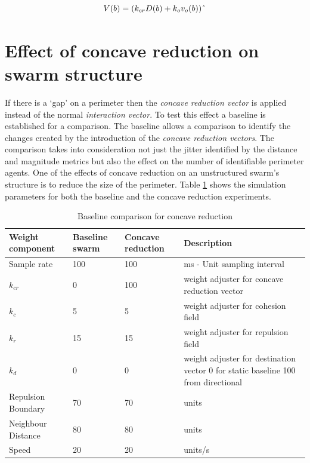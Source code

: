 \documentclass{ieeeaccess}
\begin{document}
\begin{equation}\label{eq:ConcaveVoidPhysics4}
V(b) = (k_{cr}D(b) + k_ov_o(b))\string^
\end{equation}

\section{Effect of concave reduction on swarm structure}
If there is a `gap' on a perimeter then the \textit{concave reduction vector} is applied instead of the normal \textit{interaction vector}. To test this effect a baseline is established for a comparison.
The baseline allows a comparison to identify the changes created by the introduction of the \textit{concave reduction vectors}. The comparison takes into consideration not just the jitter identified by the distance and magnitude metrics but also the effect on the number of identifiable perimeter agents. One of the effects of concave reduction on an unstructured swarm's structure is to reduce the size of the perimeter. Table \ref{tab:BaselineConcaveReduction} shows the simulation parameters for both the baseline and the concave reduction experiments.

\begin{table}
\caption{Baseline comparison for concave reduction}\label{tab:BaselineConcaveReduction}
\begin{center}
\begin{tabular}{| p{1.4cm} | p{1.2cm} | p{1.2cm} | p{2.5cm} |}
\hline
\bf Weight \bf component & \bf Baseline \bf swarm & \bf Concave \bf reduction & \bf Description \\ \hline
Sample rate & 100 & 100 & ms - Unit sampling interval\\  \hline
$k_{cr}$ & 0 & 100 & weight adjuster for concave reduction vector\\  \hline
$k_c$ & 5 & 5 & weight adjuster for cohesion field\\  \hline
$k_r$ & 15 & 15 & weight adjuster for repulsion field\\  \hline
$k_d$ & 0 & 0 & weight adjuster for destination vector 0 for static baseline 100 from directional\\  \hline
Repulsion Boundary & 70 & 70 & units\\  \hline
Neighbour Distance & 80 & 80 & units\\  \hline
Speed & 20 & 20 & units/s\\  \hline
\end{tabular}
\end{center}
\end{table}
\end{document}
